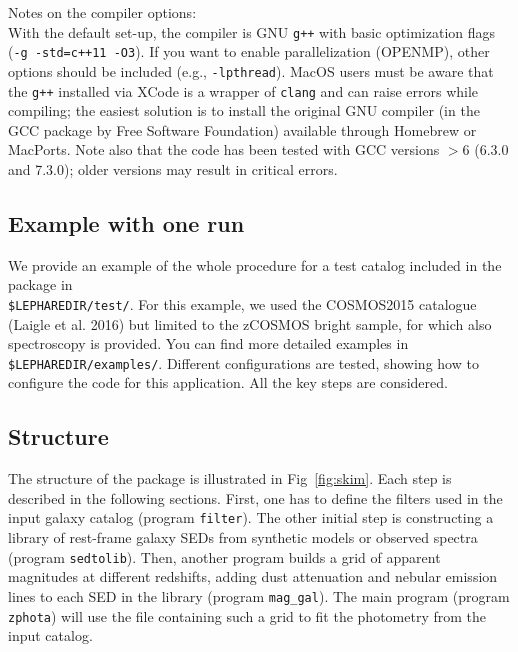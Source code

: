 \documentclass[12pt]{article}
\begin{document}


Notes on the compiler options:\\
 With the default set-up, the compiler is GNU \texttt{g++} with basic 
optimization flags (\texttt{-g -std=c++11 -O3}). If you want to enable parallelization (OPENMP), other options should be included (e.g., \texttt{-lpthread}). MacOS users must be aware that the \texttt{g++} installed via XCode is a wrapper of \texttt{clang} and can raise errors while compiling; the easiest solution is to install the original GNU compiler (in the GCC package by Free Software Foundation) available through Homebrew or MacPorts. Note also that the code has been tested with GCC versions $>6$ (6.3.0 and 7.3.0); older versions may result in critical errors.     

\subsection{Example with one run}

We provide an example of the whole procedure for a test catalog included in the package in \\ \texttt{\$LEPHAREDIR/test/}.
For this example, we used the COSMOS2015 catalogue (Laigle et al. 2016)  but limited to the zCOSMOS bright sample, for which also spectroscopy is provided. You can find more detailed examples in \texttt{\$LEPHAREDIR/examples/}. Different configurations are tested, showing how to configure the code for this application. All the key steps are considered.

\subsection{Structure}

 The structure of the package is illustrated in Fig~\ref{fig:skim}. 
 Each step is described in the following sections. First, one has to define the filters used in the input galaxy catalog (program \texttt{filter}). The other initial step is constructing a library of rest-frame galaxy SEDs from synthetic models or observed spectra (program \texttt{sedtolib}). Then, another program builds a grid of apparent magnitudes at different redshifts, adding dust attenuation and nebular emission lines to each SED in the library (program  \texttt{mag\_gal}). The main \lp program (program \texttt{zphota}) will use the file containing such a grid to fit the photometry from the input catalog.
 
\end{document}
